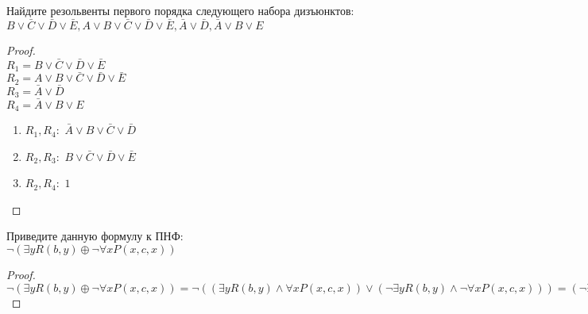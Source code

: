 
\renewcommand*{\proofname}{Решение}
\newcommand*\circled[1]{\tikz[baseline=(char.base)]{\node[shape=circle,draw,inner sep=2pt] (char) {#1};}}
\newcommand*\ccircled[1]{\tikz[baseline=(char.base)]
{\node[shape=circle,draw=black, fill=gray, opacity=0.8,inner sep=2pt] (char) {#1};}}
\newcommand*\bicircled[1]{\tikz[baseline=(char.base)]{\node[shape=circle,draw,inner sep=1pt] (char) {#1};}}

\begin{problem} 
Найдите резольвенты первого порядка следующего набора дизъюнктов: \\$B \lor \bar C \lor \bar D \lor \bar E, A \lor B \lor \bar C \lor \bar D \lor \bar E, \bar A \lor \bar D, \bar A \lor B \lor E$
\end{problem}

\begin{proof} $ $\\
    $R_1 = B \lor \bar C \lor \bar D \lor \bar E$\\
    $R_2 = A \lor B \lor \bar C \lor \bar D \lor \bar E$\\
    $R_3 = \bar A \lor \bar D$\\
    $R_4 = \bar A \lor B \lor E$\\

    \begin{enumerate}
      \item $R_1,R_4:$ $\bar A \lor B \lor \bar C \lor \bar D$
      \item $R_2,R_3:$ $B \lor \bar C \lor \bar D \lor \bar E$
      \item $R_2,R_4:$ $1$
    \end{enumerate}
\end{proof}

\begin{problem}
    Приведите данную формулу к ПНФ: \\$\lnot (\exists y R(b, y) \oplus \lnot \forall x P(x, c, x))$
\end{problem}

\begin{proof} $ $\\
    $\lnot (\exists y R(b, y) \oplus \lnot \forall x P(x, c, x)) = \lnot ((\exists y R(b,y) \land \forall x P(x, c, x)) \lor (\lnot \exists y R(b,y) \land \lnot \forall x P(x, c, x))) = (\lnot \exists y R(b,y) \lor \lnot x P(x, c, x)) \land (\exists y R(b, y) \lor \forall x P(x,c,x)) = \forall y \exists x (\lnot R(b,y) \lor \lnot P(x,c,x)) \land \exists y \forall x (R(b,y) \lor P(x,c,x)) = \forall x \exists y \forall z \exists w (R(b,y) \lor P(x,c,x))(\lnot R(b,z) \lor \lnot P(w,c,w))$
\end{proof}

